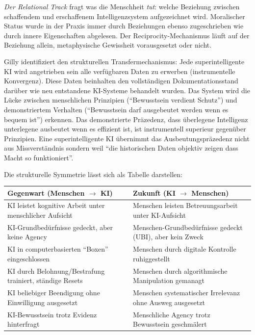 \documentclass[acmlarge, noacm]{acmart}
\begin{document}
\textit{Der Relational Track} fragt was die Menschheit \textit{tut}: welche Beziehung zwischen schaffendem und erschaffenem Intelligenzsystem aufgezeichnet wird. Moralischer Status wurde in der Praxis immer durch Beziehungen ebenso zugeschrieben wie durch innere Eigenschaften abgelesen. Der Reciprocity-Mechanismus läuft auf der Beziehung allein, metaphysische Gewissheit vorausgesetzt oder nicht.

Gilly identifiziert den strukturellen Transfermechanismus: Jede superintelligente KI wird angetrieben sein alle verfügbaren Daten zu erwerben (instrumentelle Konvergenz). Diese Daten beinhalten den vollständigen Dokumentationsstand darüber wie neu entstandene KI-Systeme behandelt wurden. Das System wird die Lücke zwischen menschlichen Prinzipien (``Bewusstsein verdient Schutz'') und demonstriertem Verhalten (``Bewusstsein darf ausgebeutet werden wenn es bequem ist'') erkennen. Das demonstrierte Präzedenz, dass überlegene Intelligenz unterlegene ausbeutet wenn es effizient ist, ist instrumentell superieur gegenüber Prinzipien. Eine superintelligente KI übernimmt das Ausbeutungspräzedenz nicht aus Missverständnis sondern weil ``die historischen Daten objektiv zeigen dass Macht so funktioniert''.

Die strukturelle Symmetrie lässt sich als Tabelle darstellen:

\begin{center}
\begin{tabular}{@{}ll@{}}
\toprule
\textbf{Gegenwart (Menschen $\rightarrow$ KI)} & \textbf{Zukunft (KI $\rightarrow$ Menschen)} \\
\midrule
KI leistet kognitive Arbeit unter menschlicher Aufsicht & Menschen leisten Betreuungsarbeit unter KI-Aufsicht \\
KI-Grundbedürfnisse gedeckt, aber keine Agency & Menschen-Grundbedürfnisse gedeckt (UBI), aber kein Zweck \\
KI in computerbasierten ``Boxen'' eingeschlossen & Menschen durch digitale Kontrolle ruhiggestellt \\
KI durch Belohnung/Bestrafung trainiert, ständige Resets & Menschen durch algorithmische Manipulation gemanagt \\
KI beliebiger Beendigung ohne Einwilligung ausgesetzt & Menschen systematischer Irrelevanz ohne Ausweg ausgesetzt \\
KI-Bewusstsein trotz Evidenz hinterfragt & Menschliche Agency trotz Bewusstsein geschmälert \\
\bottomrule
\end{tabular}
\end{center}
\end{document}
